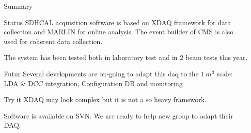 \documentclass[10pt]{beamer}
\begin{document}
\begin{frame}{Summary}
\begin{block}{Status}
SDHCAL acquisition software is based on XDAQ framework for data
collection and MARLIN for online analysis. The event builder of CMS is
also used for coherent data collection. 
\par
The system has been tested both in laboratory test and in 2 beam tests
this year.
\end{block}
\begin{block}{Futur}
Several developments are on-going to adapt this daq to the $1 ~ m^3$
scale: LDA \& DCC integration, Configuration DB and monitoring
\end{block}

\begin{block}{Try it}
XDAQ may look complex but it is not a so heavy framework. 
\par
Software is available on SVN. We are ready to help new group to adapt
their DAQ.
\end{block}
\end{frame}
\end{document}

